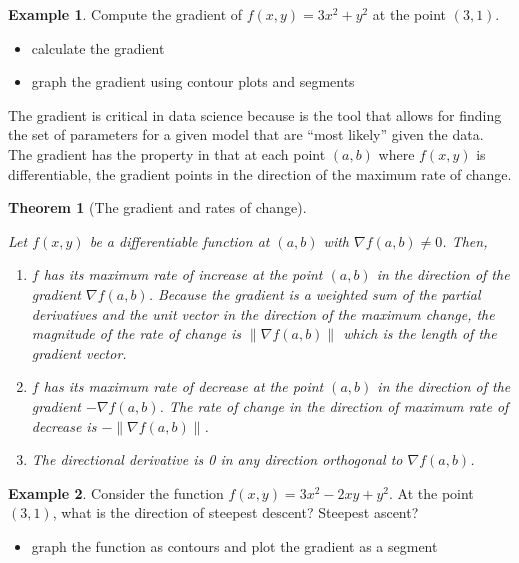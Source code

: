 \documentclass[
]{book}
\providecommand{\tightlist}{%
  \setlength{\itemsep}{0pt}\setlength{\parskip}{0pt}}
\newtheorem{theorem}{Theorem}[chapter]
\theoremstyle{definition}
\theoremstyle{definition}
\newtheorem{example}{Example}[chapter]
\theoremstyle{definition}
\theoremstyle{definition}
\theoremstyle{remark}
\begin{document}
\begin{example}

Compute the gradient of \(f(x, y) = 3x^2 + y^2\) at the point \((3, 1)\).

\begin{itemize}
\tightlist
\item
  calculate the gradient
\item
  graph the gradient using contour plots and segments
\end{itemize}

\end{example}

The gradient is critical in data science because is the tool that allows for finding the set of parameters for a given model that are ``most likely'' given the data. The gradient has the property in that at each point \((a, b)\) where \(f(x, y)\) is differentiable, the gradient points in the direction of the maximum rate of change.

\begin{theorem}[The gradient and rates of change]
\protect\hypertarget{thm:gradient}{}\label{thm:gradient}

Let \(f(x, y)\) be a differentiable function at \((a, b)\) with \(\nabla f(a, b) \neq 0\). Then,

\begin{enumerate}
\def\labelenumi{\arabic{enumi})}
\item
  \(f\) has its maximum rate of increase at the point \((a, b)\) in the direction of the gradient \(\nabla f(a, b)\). Because the gradient is a weighted sum of the partial derivatives and the unit vector in the direction of the maximum change, the magnitude of the rate of change is \(\|\nabla f(a, b)\|\) which is the length of the gradient vector.
\item
  \(f\) has its maximum rate of decrease at the point \((a, b)\) in the direction of the gradient \(-\nabla f(a, b)\). The rate of change in the direction of maximum rate of decrease is \(-\|\nabla f(a, b)\|\).
\item
  The directional derivative is 0 in any direction orthogonal to \(\nabla f(a, b)\).
\end{enumerate}

\end{theorem}

\begin{example}

Consider the function \(f(x, y) = 3x^2 - 2xy + y^2\). At the point \((3, 1)\), what is the direction of steepest descent? Steepest ascent?

\begin{itemize}
\tightlist
\item
  graph the function as contours and plot the gradient as a segment
\end{itemize}

\end{example}
\end{document}
